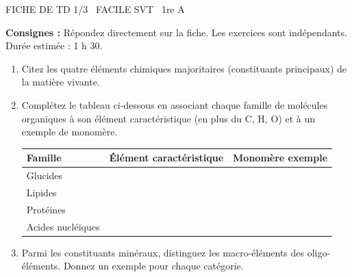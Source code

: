 \documentclass[11pt]{article}
\begin{document}
\begin{tcolorbox}[enhanced,colback=popink,colframe=popink,arc=10pt,boxrule=0pt,left=12pt,right=12pt,top=9pt,bottom=9pt]
{\color{white}\popxbold\small FICHE DE TD 1/3 \textbullet\ FACILE \hfill SVT \textbullet\ 1re A\par}
\end{tcolorbox}
\vspace{4pt}
\textbf{Consignes :} Répondez directement sur la fiche. Les exercices sont indépendants. Durée estimée : 1 h 30.

\begin{exercice}
\begin{enumerate}
    \item Citez les quatre éléments chimiques majoritaires (constituants principaux) de la matière vivante.
    \item Complétez le tableau ci-dessous en associant chaque famille de molécules organiques à son élément caractéristique (en plus du C, H, O) et à un exemple de monomère.
    \begin{tabular}{|l|c|c|}
    \hline
    \textbf{Famille} & \textbf{Élément caractéristique} & \textbf{Monomère exemple} \\
    \hline
    Glucides &  &  \\
    \hline
    Lipides &  &  \\
    \hline
    Protéines &  &  \\
    \hline
    Acides nucléiques &  &  \\
    \hline
    \end{tabular}
    \item Parmi les constituants minéraux, distinguez les macro-éléments des oligo-éléments. Donnez un exemple pour chaque catégorie.
\end{enumerate}
\end{exercice}
\end{document}
